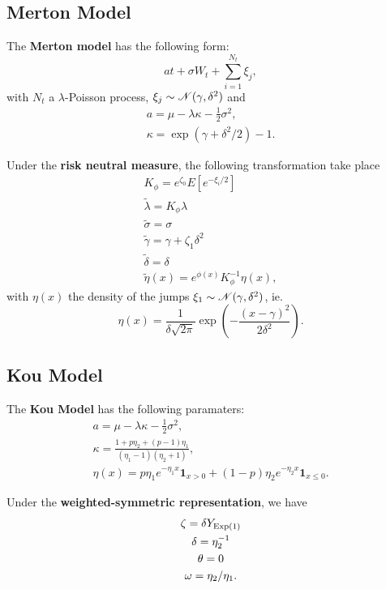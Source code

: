 \subsection{Merton Model}
\begin{outline}
  \1 The \textbf{Merton model} has the following form:
  \begin{equation*}
    at + \sigma W_t + \sum_{i=1}^{N_t} \xi_j,
  \end{equation*}
  with $N_t$ a $\lambda$-Poisson process, $\xi_j \sim \mathscr{N}(\gamma,\delta^2)$ and
  \begin{gather*}
    a = \mu -\lambda\kappa - \tfrac{1}{2}\sigma^2,\\
    \kappa=  \exp(\gamma+\delta^2/2) - 1.
  \end{gather*}

  \1 Under the \textbf{risk neutral measure}, the following transformation take place 
  \begin{gather*}
    K_\phi = e^{\zeta_0}E[e^{-\xi_i/2}]\\
    \tilde\lambda = K_\phi\lambda\\
    \tilde\sigma = \sigma\\
    \tilde\gamma = \gamma + \zeta_1\delta^2\\
    \tilde\delta = \delta\\
    \tilde\eta(x) = e^{\phi(x)}K_\phi^{-1}\eta(x),
  \end{gather*}
  with $\eta(x)$ the density of the jumps $\xi_1\sim\mathscr{N}(\gamma,\delta^2)$, ie.
  \begin{equation*}
    \eta(x) = \frac{1}{\delta\sqrt{2\pi}}\exp\left(-\frac{(x-\gamma)^2}{2\delta^2}\right).
  \end{equation*}
\end{outline}

\subsection{Kou Model}

\begin{outline}
  \1 The \textbf{Kou Model} has the following paramaters:
  \begin{gather*}
    a = \mu - \lambda\kappa - \tfrac{1}{2}\sigma^2,\\
    \kappa = \frac{1+p\eta_2+(p-1)\eta_1}{(\eta_1-1)(\eta_2+1)},\\
    \eta(x) = p\eta_1 e^{-\eta_1 x} \bm 1_{x>0} + (1-p)\eta_2 e^{-\eta_2x}\bm 1_{x\leq 0}.
  \end{gather*}

  \1 Under the \textbf{weighted-symmetric representation}, we have
  \begin{gather*}
    \zeta = \delta Y_{\operatorname{Exp}(1)}\\
    \delta = \eta_2^{-1}\\
    \theta = 0\\
    \omega = \eta_2/\eta_1.
  \end{gather*}
\end{outline}


